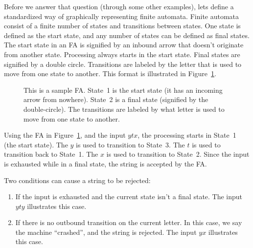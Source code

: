 \documentclass[letterpaper,12pt,openany,reqno]{book}%
\newcommand{\faterminalnode}[3] {\node at (#1) (#2) [circle, draw, double, minimum size=24pt] {#2};}
\newcommand{\fastart}[1] {\coordinate (start) at (#1);}
\newcommand{\fanonterminalnode}[2] {\node at (#1) (#2) [circle, draw, minimum size=24pt] {#2};}
\newcommand{\fatransition}[3] {\draw [->] (#1) -- (#2) node [midway, above] {#3};}
\newcommand{\faarctransition}[5] {\draw [->] (#1) to[out=#4, in=#5] node  [midway, above] {#3} (#2) ;}
\begin{document}
Before we answer that question (through some other examples), lets define a standardized way of graphically representing finite automata. Finite automata consist of a finite number of states and transitions between states. One state is defined as the start state, and any number of states can be defined as final states. The start state in an FA is signified by an inbound arrow that doesn't originate from another state. Processing always starts in the start state. Final states are signified by a double circle. Transitions are labeled by the letter that is used to move from one state to another. This format is illustrated in Figure~\ref{F.FA_1}.

\begin{figure}[hbt]
\centering
{}
 \caption[Sample Finite Automaton]{This is a sample FA. State~1 is the start state (it has an incoming arrow from nowhere). State~2 is a final state (signified by the double-circle). The transitions are labeled by what letter is used to move from one state to another.}
  \label{F.FA_1}
\end{figure}

Using the FA in Figure~\ref{F.FA_1}, and the input $ytx$, the processing starts in State~1 (the start state). The $y$ is used to transition to State~3. The $t$ is used to transition back to State~1. The $x$ is used to transition to State~2. Since the input is exhausted while in a final state, the string is accepted by the FA.

Two conditions can cause a string to be rejected: 
\begin{enumerate}
\item If the input is exhausted and the current state isn't a final state. The input $yty$ illustrates this case.
\item If there is no outbound transition on the current letter. In this case, we say the machine ``crashed'', and the string is rejected. The input $yx$ illustrates this case.
\end{enumerate}
\end{document}
